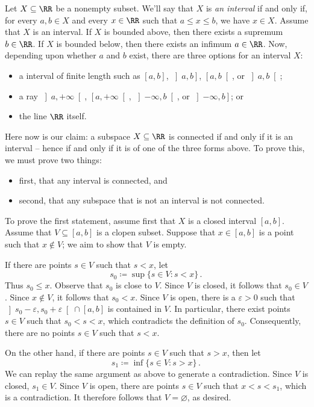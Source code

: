 \begin{exm}
	Let $X \subseteq\RR$ be a nonempty subset.
	We'll say that $X$ is \emph{an interval} if and only if, for every $a, b \in X$ and every $x \in \RR $ such that $a \leq x \leq b$, we have $ x\in X$.
	Assume that $X$ is an interval.
	If $X$ is bounded above, then there exists a supremum $b \in \RR$.
	If $X$ is bounded below, then there exists an infimum $a \in \RR$.
	Now, depending upon whether $a$ and $b$ exist, there are three options for an interval $X$:
	\begin{itemize}
		\item a interval of finite length such as $[a,b]$, $\left]a,b\right]$, $\left[a,b\right[$, or $\left]a,b\right[$;
		\item a ray $\left]a,+\infty\right[$, $\left[a,+\infty\right[$, $\left]-\infty, b\right[$, or $\left]-\infty, b\right]$; or
		\item the line $\RR$ itself.
	\end{itemize}
	
	Here now is our claim:
	a subspace $X \subseteq \RR$ is connected if and only if it is an interval -- hence if and only if it is of one of the three forms above.
	To prove this, we must prove two things:
	\begin{itemize}
		\item first, that any interval is connected, and
		\item second, that any subspace that is not an interval is not connected.
	\end{itemize}

	To prove the first statement, assume first that $X$ is a closed interval $[a,b]$.
	Assume that $V \subseteq [a,b]$ is a clopen subset.
	Suppose that $x \in [a,b]$ is a point such that $x \notin V$;
	we aim to show that $V$ is empty.
	
	If there are points $ s\in V$ such that $ s < x$, let
	\[
		s_0 \coloneq \sup \{s\in V : s< x\} \period
	\]
	Thus $s_0 \leq x$.
	Observe that $s_0$ is close to $V$.
	Since $V$ is closed, it follows that $s_0 \in V$.
	Since $x \notin V$, it follows that $s_0<x$.
	Since $V$ is open, there is a $\varepsilon >0$ such that $\left]s_0-\varepsilon,s_0+\varepsilon\right[ \cap [a,b]$ is contained in $V$.
	In particular, there exist points $s \in V$ such that $s_0 < s < x$, which contradicts the definition of $s_0$.
	Consequently, there are no points $s\in V$ such that $s<x$.

	On the other hand, if there are points $s \in V$ such that $s>x$, then let
	\[
		s_1 \coloneq \inf \{s\in V : s>x\} \period
	\]
	We can replay the same argument as above to generate a contradiction.
	Since $V$ is closed, $s_1 \in V$.
	Since $V$ is open, there are points $ s\in V$ such that $ x<s<s_1$, which is a contradiction.
	It therefore follows that $V=\varnothing$, as desired.


\end{exm}
